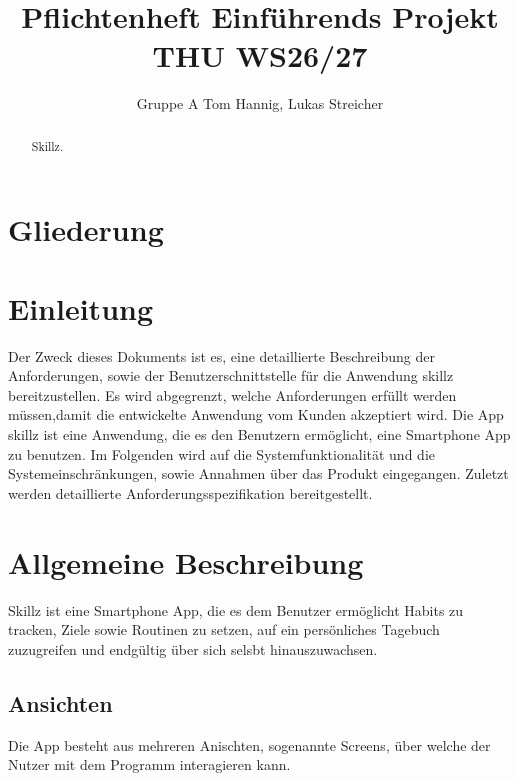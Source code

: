 \documentclass{article}
\title{Pflichtenheft Einführends Projekt THU WS26/27}
\author{Gruppe A Tom Hannig, Lukas Streicher}
\begin{document}
\maketitle

\begin{abstract}
Skillz.
\end{abstract}
\section{Gliederung}
\section{Einleitung}

 Der Zweck dieses Dokuments ist es, eine detaillierte Beschreibung der Anforderungen, sowie der Benutzerschnittstelle für die Anwendung skillz bereitzustellen. 
Es wird abgegrenzt, welche Anforderungen erfüllt werden müssen,damit die entwickelte Anwendung vom Kunden akzeptiert wird. Die App skillz ist eine Anwendung, die es den Benutzern ermöglicht, eine Smartphone App zu benutzen.
Im Folgenden wird auf die Systemfunktionalität und die Systemeinschränkungen, sowie Annahmen über das Produkt eingegangen.
Zuletzt werden detaillierte Anforderungsspezifikation bereitgestellt.

\section{Allgemeine Beschreibung}
Skillz ist eine Smartphone App, die es dem Benutzer ermöglicht Habits zu tracken, Ziele sowie Routinen zu setzen, auf ein persönliches Tagebuch zuzugreifen und endgültig über sich selsbt hinauszuwachsen.
\subsection{Ansichten}

Die App besteht aus mehreren Anischten, sogenannte Screens, über welche der Nutzer mit dem Programm interagieren kann.
\end{document}
